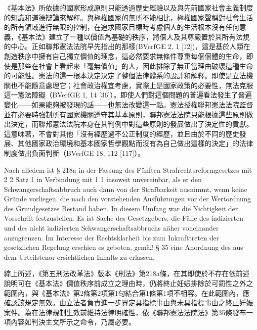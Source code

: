 \documentclass[12pt]{article}
\begin{document}
\begin{transpara}
《基本法》所依據的國家形成原則只能透過歷史經驗以及與先前國家社會主義制度的知識和道德辯論來解釋。與極權國家的無所不能相比，極權國家聲稱對社會生活的所有領域進行無限的控制，在追求國家目標時考慮個人的生活根本沒有任何意義，《基本法》建立了一種以價值為基礎的秩序，將個人及其尊嚴置於其所有法規的中心。正如聯邦憲法法院早先指出的那樣(BVerfGE 2, 1 [12])，這是基於人類在創造秩序中擁有自己獨立價值的理念，這必然要求無條件尊重每個個體的生命，即使是那些在社會上看起來「毫無價值」的人，因此排除了無正當理由破壞這種生命的可能性。憲法的這一根本決定決定了整個法律體系的設計和解釋。即使是立法機關也不能隨意處理它；社會政治權宜考慮，實際上是國家政策的必要性，無法克服這一憲法障礙（BVerfGE 1, 14 [36]）。即使人們對這個問題的普遍看法發生了普遍變化——如果能夠被發現的話——也無法改變這一點。憲法授權聯邦憲法法院監督並在必要時強制所有國家機關遵守其基本原則，聯邦憲法法院只能根據這些原則做出決定，而聯邦憲法法院本身在其判例中對這些原則的發展做出了決定性的貢獻。這意味著，不會對其他「沒有經歷過不公正制度的經歷，並且由於不同的歷史發展、其他國家政治環境和基本國家哲學觀點而沒有為自己做出這樣的決定」的法律制度做出負面判斷（BVerfGE 18, 112 [117]）。
\end{transpara}

\syncleft
\begin{sourcepara}
Nach alledem ist § 218a \abbrStGB{} in der Fassung des Fünften Strafrechtsreformgesetzes mit \abbrArt{} 2 \abbrAbs{} 2 Satz 1 in Verbindung mit \abbrArt{} 1 \abbrAbs{} 1 \abbrGG{}\ggfnLifeDignityDE{} insoweit unvereinbar, als er den Schwangerschaftsabbruch auch dann von der Strafbarkeit ausnimmt, wenn keine Gründe vorliegen, die nach den vorstehenden Ausführungen vor der Wertordnung des Grundgesetzes Bestand haben. In diesem Umfang war die Nichtigkeit der Vorschrift festzustellen. Es ist Sache des Gesetzgebers, die Fälle des indizierten und des nicht indizierten Schwangerschaftsabbruchs näher voneinander anzugrenzen. Im Interesse der Rechtsklarheit bis zum Inkrafttreten der gesetzlichen Regelung erschien es geboten, gemäß § 35 \abbrBVerfGG{} eine Anordnung des aus dem Urteilstenor ersichtlichen Inhalts zu erlassen.
\end{sourcepara}
\begin{transpara}
綜上所述，《第五刑法改革法》版本《刑法》第218a條，在其即使於不存在依前述說明可在《基本法》價值秩序前成立之理由時，仍將終止妊娠排除於可罰性之外之範圍內，與《基本法》第2條第2項第1句結合第1條第1項\ggfnLifeDignityZH{}不相容。在此範圍內，應確認該規定無效。由立法者負責進一步界定具指標事由與未具指標事由之終止妊娠案件。為在法律規制生效前維持法律明確性，依《聯邦憲法法院法》第35條發布一項內容如判決主文所示之命令，乃屬必要。
\end{transpara}
\end{document}
